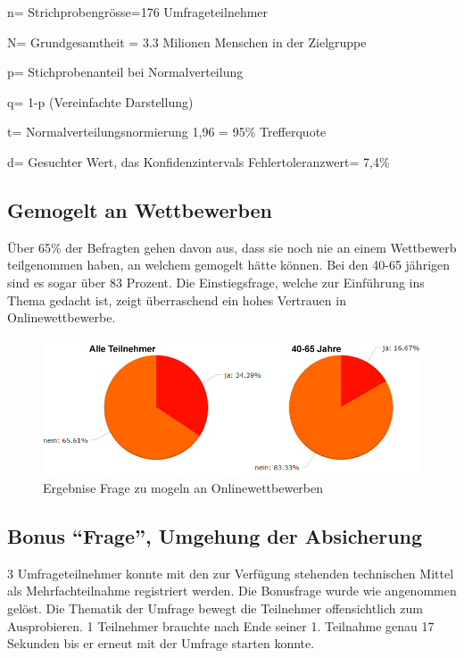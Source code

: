 n= Strichprobengrösse=176 Umfrageteilnehmer

N= Grundgesamtheit = 3.3 Milionen Menschen in der Zielgruppe

p= Stichprobenanteil bei Normalverteilung

q= 1-p (Vereinfachte Darstellung)

t= Normalverteilungsnormierung 1,96 = 95\% Trefferquote

d= Gesuchter Wert, das Konfidenzintervals Fehlertoleranzwert= 7,4\%

\subsection{Gemogelt an Wettbewerben}\label{gemogelt-an-wettbewerben}

Über 65\% der Befragten gehen davon aus, dass sie noch nie an einem
Wettbewerb teilgenommen haben, an welchem gemogelt hätte können. Bei den
40-65 jährigen sind es sogar über 83 Prozent. Die Einstiegsfrage, welche
zur Einführung ins Thema gedacht ist, zeigt überraschend ein hohes
Vertrauen in Onlinewettbewerbe.

\begin{figure}[htbp]
\centering
\includegraphics{images/studie/mogeln.jpg}
\caption{Ergebnise Frage zu mogeln an Onlinewettbewerben}
\end{figure}

\subsection{\texorpdfstring{Bonus ``Frage'', Umgehung der
Absicherung}{Bonus Frage, Umgehung der Absicherung}}\label{bonus-frage-umgehung-der-absicherung-1}

3 Umfrageteilnehmer konnte mit den zur Verfügung stehenden technischen
Mittel als Mehrfachteilnahme registriert werden. Die Bonusfrage wurde
wie angenommen gelöst. Die Thematik der Umfrage bewegt die Teilnehmer
offensichtlich zum Ausprobieren. 1 Teilnehmer brauchte nach Ende seiner
1. Teilnahme genau 17 Sekunden bis er erneut mit der Umfrage starten
konnte.


